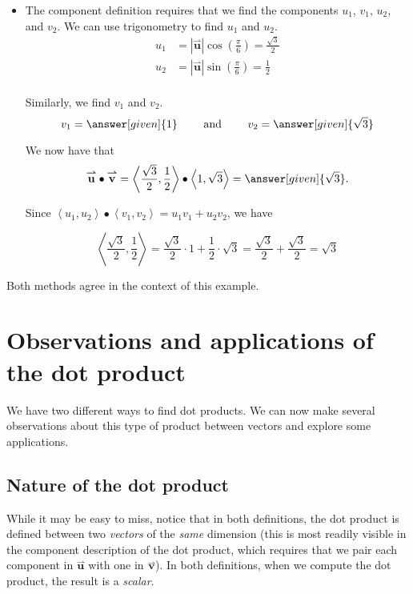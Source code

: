 \documentclass{ximera}
\begin{document}
\begin{example}
\begin{itemize}
\item The component definition requires that we find the components $u_1$, $v_1$, $u_2$, and $v_2$.  We can use trigonometry to find  $u_1$ and $u_2$.
\begin{align*}
u_1 &= |\overset{\boldsymbol{\rightharpoonup}}{\mathbf{u}}|\cos\left(\frac{\pi}{6}\right) =\frac{\sqrt{3}}{2} \\
u_2 &= |\overset{\boldsymbol{\rightharpoonup}}{\mathbf{u}}|\sin\left(\frac{\pi}{6}\right) =\frac{1}{2} \\
\end{align*}

Similarly, we find $v_1$ and $v_2$.
\[
v_1 = \answer[given]{1} \qquad \textrm{ and } \qquad v_2 = \answer[given]{\sqrt{3}}
\]

We now have that 
\[
\overset{\boldsymbol{\rightharpoonup}}{\mathbf{u}} \bullet \overset{\boldsymbol{\rightharpoonup}}{\mathbf{v}} = \left< \frac{\sqrt{3}}{2},\frac{1}{2} \right> \bullet \left< 1,\sqrt{3} \right> = \answer[given]{\sqrt{3}}.
\]

\begin{hint}
Since $\left< u_1,u_2 \right> \bullet \left< v_1,v_2 \right> = u_1v_1+u_2v_2$, we have

\[
\left< \frac{\sqrt{3}}{2},\frac{1}{2} \right> = \frac{\sqrt{3}}{2} \cdot 1 +  \frac{1}{2}  \cdot \sqrt{3} = \frac{\sqrt{3}}{2}+\frac{\sqrt{3}}{2} = \sqrt{3}
\]
\end{hint}
\end{itemize}

Both methods agree in the context of this example.

\end{example}



\section{Observations and applications of the dot product}

We have two different ways to find dot products.  We can now make several observations about this type of product between vectors and explore some applications.

\subsection{Nature of the dot product}
While it may be easy to miss, notice that in both definitions, the dot product is defined between two \emph{vectors} of the \emph{same} dimension (this is most readily visible in the component description of the dot product, which requires that we pair each component in $\overset{\boldsymbol{\rightharpoonup}}{\mathbf{u}}$ with one in $\overset{\boldsymbol{\rightharpoonup}}{\mathbf{v}}$).  In both definitions, when we compute the dot product, the result is a \emph{scalar}.
\end{document}
